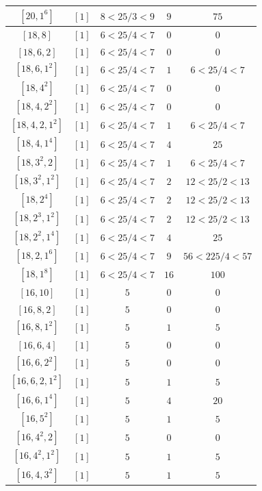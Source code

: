 \documentclass{article}%
\begin{document}
\begin{center}
\begin{longtable}{||c|c|c|c|c||}
$[20, 1^{6}]$ & $[1]$ & $8 < 25/3 < 9$ & $9$ & $75$ \\ \hline 
$[18, 8]$ & $[1]$ & $6 < 25/4 < 7$ & $0$ & $0$ \\ \hline 
$[18, 6, 2]$ & $[1]$ & $6 < 25/4 < 7$ & $0$ & $0$ \\ \hline 
$[18, 6, 1^{2}]$ & $[1]$ & $6 < 25/4 < 7$ & $1$ & $6 < 25/4 < 7$ \\ \hline 
$[18, 4^{2}]$ & $[1]$ & $6 < 25/4 < 7$ & $0$ & $0$ \\ \hline 
$[18, 4, 2^{2}]$ & $[1]$ & $6 < 25/4 < 7$ & $0$ & $0$ \\ \hline 
$[18, 4, 2, 1^{2}]$ & $[1]$ & $6 < 25/4 < 7$ & $1$ & $6 < 25/4 < 7$ \\ \hline 
$[18, 4, 1^{4}]$ & $[1]$ & $6 < 25/4 < 7$ & $4$ & $25$ \\ \hline 
$[18, 3^{2}, 2]$ & $[1]$ & $6 < 25/4 < 7$ & $1$ & $6 < 25/4 < 7$ \\ \hline 
$[18, 3^{2}, 1^{2}]$ & $[1]$ & $6 < 25/4 < 7$ & $2$ & $12 < 25/2 < 13$ \\ \hline 
$[18, 2^{4}]$ & $[1]$ & $6 < 25/4 < 7$ & $2$ & $12 < 25/2 < 13$ \\ \hline 
$[18, 2^{3}, 1^{2}]$ & $[1]$ & $6 < 25/4 < 7$ & $2$ & $12 < 25/2 < 13$ \\ \hline 
$[18, 2^{2}, 1^{4}]$ & $[1]$ & $6 < 25/4 < 7$ & $4$ & $25$ \\ \hline 
$[18, 2, 1^{6}]$ & $[1]$ & $6 < 25/4 < 7$ & $9$ & $56 < 225/4 < 57$ \\ \hline 
$[18, 1^{8}]$ & $[1]$ & $6 < 25/4 < 7$ & $16$ & $100$ \\ \hline 
$[16, 10]$ & $[1]$ & $5$ & $0$ & $0$ \\ \hline 
$[16, 8, 2]$ & $[1]$ & $5$ & $0$ & $0$ \\ \hline 
$[16, 8, 1^{2}]$ & $[1]$ & $5$ & $1$ & $5$ \\ \hline 
$[16, 6, 4]$ & $[1]$ & $5$ & $0$ & $0$ \\ \hline 
$[16, 6, 2^{2}]$ & $[1]$ & $5$ & $0$ & $0$ \\ \hline 
$[16, 6, 2, 1^{2}]$ & $[1]$ & $5$ & $1$ & $5$ \\ \hline 
$[16, 6, 1^{4}]$ & $[1]$ & $5$ & $4$ & $20$ \\ \hline 
$[16, 5^{2}]$ & $[1]$ & $5$ & $1$ & $5$ \\ \hline 
$[16, 4^{2}, 2]$ & $[1]$ & $5$ & $0$ & $0$ \\ \hline 
$[16, 4^{2}, 1^{2}]$ & $[1]$ & $5$ & $1$ & $5$ \\ \hline 
$[16, 4, 3^{2}]$ & $[1]$ & $5$ & $1$ & $5$ \\ \hline 

\end{longtable}
\end{center}
\end{document}
